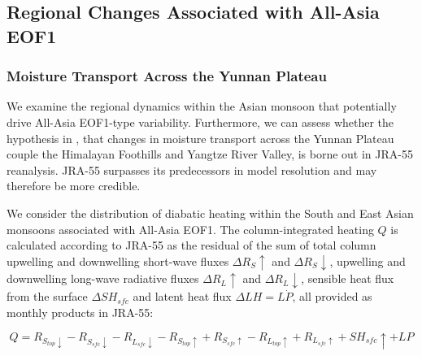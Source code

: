 



\subsection{Regional Changes Associated with All-Asia EOF1}

\subsubsection{Moisture Transport Across the Yunnan Plateau}

	We examine the regional dynamics within the Asian monsoon that potentially drive All-Asia EOF1-type variability. Furthermore, we can assess whether the hypothesis in \citet{Day2015}, that changes in moisture transport across the Yunnan Plateau couple the Himalayan Foothills and Yangtze River Valley, is borne out in JRA-55 reanalysis. JRA-55 surpasses its predecessors in model resolution and may therefore be more credible.
	
	We consider the distribution of diabatic heating within the South and East Asian monsoons associated with All-Asia EOF1. The column-integrated heating $Q$ is calculated according to JRA-55 as the residual of the sum of total column upwelling and downwelling short-wave fluxes $\Delta R_S\uparrow$ and $\Delta R_S\downarrow$, upwelling and downwelling long-wave radiative fluxes $\Delta R_L\uparrow$ and $\Delta R_L\downarrow$, sensible heat flux from the surface  $\Delta SH_{sfc}$ and latent heat flux  $\Delta LH=L \dot P$, all provided as monthly products in JRA-55:
	
\begin{equation}
	Q=R_{S_{top}\downarrow}-R_{S_{sfc}\downarrow}-R_{L_{sfc}\downarrow}-R_{S_{top}\uparrow}+R_{S_{sfc}\uparrow}-R_{L_{top}\uparrow}+R_{L_{sfc}\uparrow}+SH_{sfc}\uparrow+LP
\end{equation}
	
